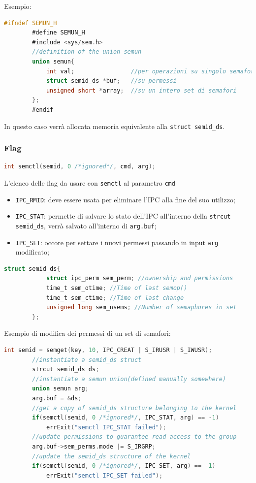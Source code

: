 \documentclass[a4paper, 12pt]{book}
\begin{document}
    Esempio:
    \begin{lstlisting}[language=C]
        #ifndef SEMUN_H
        #define SEMUN_H
        #include <sys/sem.h>
        //definition of the union semun 
        union semun{
            int val;                //per operazioni su singolo semaforo
            struct semid_ds *buf;   //su permessi 
            unsigned short *array;  //su un intero set di semafori
        };
        #endif
    \end{lstlisting}
    In questo caso verrà allocata memoria equivalente alla 
    \verb|struct semid_ds|.

    \subsubsection{Flag}

    \begin{lstlisting}[language=C]
        int semctl(semid, 0 /*ignored*/, cmd, arg);
    \end{lstlisting}
    L'elenco delle flag da usare con \verb|semctl| al parametro 
    \verb|cmd|
    \begin{itemize}
        \item \verb|IPC_RMID|: deve essere usata per eliminare l'IPC 
        alla fine del suo utilizzo;
        \item \verb|IPC_STAT|: permette di salvare lo stato dell'IPC 
        all'interno della \verb|strcut semid_ds|, verrà salvato 
        all'interno di \verb|arg.buf|;
        \item \verb|IPC_SET|: occore per settare i nuovi permessi
        passando in input \verb|arg| modificato;
    \end{itemize}
    \begin{lstlisting}[language=C]
        struct semid_ds{
            struct ipc_perm sem_perm; //ownership and permissions
            time_t sem_otime; //Time of last semop()
            time_t sem_ctime; //Time of last change
            unsigned long sem_nsems; //Number of semaphores in set
        };
    \end{lstlisting}
    Esempio di modifica dei permessi di un set di semafori:
    \begin{lstlisting}[language=C]
        int semid = semget(key, 10, IPC_CREAT | S_IRUSR | S_IWUSR);
        //instantiate a semid_ds struct 
        strcut semid_ds ds;
        //instantiate a semun union(defined manually somewhere)
        union semun arg;
        arg.buf = &ds;
        //get a copy of semid_ds structure belonging to the kernel 
        if(semctl(semid, 0 /*ignored*/, IPC_STAT, arg) == -1)
            errExit("semctl IPC_STAT failed");
        //update permissions to guarantee read access to the group 
        arg.buf->sem_perms.mode |= S_IRGRP;
        //update the semid_ds structure of the kernel 
        if(semctl(semid, 0 /*ignored*/, IPC_SET, arg) == -1)
            errExit("semctl IPC_SET failed");
    \end{lstlisting}
\end{document}
